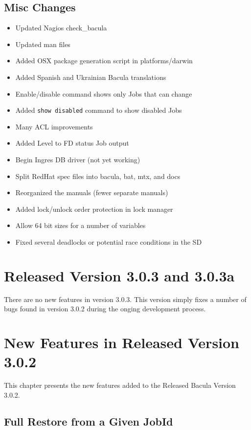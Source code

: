 \section{Misc Changes}
\label{sec:miscchanges}

\begin{itemize}
\item Updated Nagios check\_bacula
\item Updated man files
\item Added OSX package generation script in platforms/darwin
\item Added Spanish and Ukrainian Bacula translations
\item Enable/disable command shows only Jobs that can change
\item Added \texttt{show disabled} command to show disabled Jobs
\item Many ACL improvements
\item Added Level to FD status Job output
\item Begin Ingres DB driver (not yet working)
\item Split RedHat spec files into bacula, bat, mtx, and docs
\item Reorganized the manuals (fewer separate manuals)
\item Added lock/unlock order protection in lock manager
\item Allow 64 bit sizes for a number of variables
\item Fixed several deadlocks or potential race conditions in the SD
\end{itemize}

\chapter{Released Version 3.0.3 and 3.0.3a}

There are no new features in version 3.0.3.  This version simply fixes a
number of bugs found in version 3.0.2 during the onging development
process.

\chapter{New Features in Released Version 3.0.2}

This chapter presents the new features added to the
Released Bacula Version 3.0.2.

\section{Full Restore from a Given JobId}

